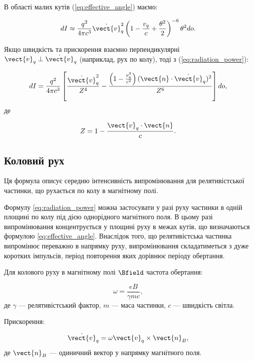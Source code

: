 В області малих кутів (\ref{eq:effective_angle}) маємо:

\begin{equation*}
	dI \approx \frac{q^2}{4\pi c^3} \dot{\vect{v}}_q^2 \left( 1 - \frac{v_q}{c} + \frac{\theta^2}{2} \right)^{-6} \theta^2 do.
\end{equation*}

Якщо швидкість та прискорення взаємно перпендикулярні \( \vect{v}_q \perp \dot{\vect{v}}_q \) (наприклад, рух по колу), тоді з
(\ref{eq:radiation_power}):


\begin{equation}\label{eq:4.1.14}
	dI = \frac{q^2}{4\pi c^3} \left[ \frac{\dot{\vect{v}}_q^2}{Z^4} - \frac{\left(1 - \frac{v_q^2}{c^2}\right) (\vect{n} \cdot \dot{\vect{v}}_q)^2}{Z^6}
		\right] do,
\end{equation}
де

\begin{equation*}
	Z = 1 - \frac{\vect{v}_q \cdot \vect{n}}{c}.
\end{equation*}

\subsection*{Коловий рух}

Ця формула описує середню інтенсивність випромінювання для релятивістської частинки, що рухається по колу в магнітному полі.

Формулу \eqref{eq:radiation_power} можна застосувати у разі руху частинки в одній площині по колу під дією однорідного магнітного поля. В цьому разі
випромінювання
концентрується у площині руху в межах кутів, що визначаються формулою \eqref{eq:effective_angle}. Внаслідок того, що релятивістська частинка випромінює
переважно в
напрямку руху, випромінювання складатиметься з дуже коротких імпульсів, період повторення яких дорівнює періоду обертання.

Для колового руху в магнітному полі \( \Bfield \) частота обертання:

\begin{equation*}
	\omega = \frac{eB}{\gamma m c},
\end{equation*}
де \( \gamma \) --- релятивістський фактор, \( m \) --- маса частинки, \( c \) --- швидкість світла.

Прискорення:

\begin{equation*}
	\dot{\vect{v}}_q = \omega \vect{v}_q \times \vect{n}_B,
\end{equation*}
де \( \vect{n}_B \) --- одиничний вектор у напрямку магнітного поля.

